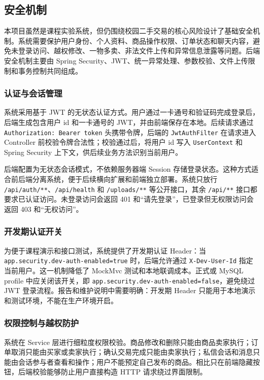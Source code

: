 ﻿\documentclass[UTF8,a4paper,12pt]{ctexart}
\begin{document}
\subsection{安全机制}
本项目虽然是课程实验系统，但仍围绕校园二手交易的核心风险设计了基础安全机制。系统需要保护用户身份、个人资料、商品操作权限、订单状态和聊天内容，避免未登录访问、越权修改、一物多卖、非法文件上传和异常信息泄露等问题。后端安全机制主要由 Spring Security、JWT、统一异常处理、参数校验、文件上传限制和事务控制共同组成。

\subsubsection{认证与会话管理}
系统采用基于 JWT 的无状态认证方式。用户通过一卡通号和验证码完成登录后，后端生成包含用户 id 和一卡通号的 JWT，并由前端保存在本地。后续请求通过 \texttt{Authorization: Bearer token} 头携带令牌，后端的 \texttt{JwtAuthFilter} 在请求进入 Controller 前校验令牌合法性；校验通过后，将用户 id 写入 \texttt{UserContext} 和 Spring Security 上下文，供后续业务方法识别当前用户。

后端配置为无状态会话模式，不依赖服务器端 Session 存储登录状态。这种方式适合前后端分离系统，便于后续横向扩展和前端独立部署。系统只放行 \texttt{/api/auth/**}、\texttt{/api/health} 和 \texttt{/uploads/**} 等公开接口，其余 \texttt{/api/**} 接口都要求已认证访问。未登录访问会返回 401 和“请先登录”，已登录但无权限访问会返回 403 和“无权访问”。

\subsubsection{开发期认证开关}
为便于课程演示和接口测试，系统提供了开发期认证 Header：当 \texttt{app.security.dev-auth-enabled=true} 时，后端允许通过 \texttt{X-Dev-User-Id} 指定当前用户。这一机制降低了 MockMvc 测试和本地联调成本。正式或 MySQL profile 中应关闭该开关，即 \texttt{app.security.dev-auth-enabled=false}，避免绕过 JWT 登录流程。报告和维护说明中需要明确：开发期 Header 只能用于本地演示和测试环境，不能在生产环境开启。

\subsubsection{权限控制与越权防护}
系统在 Service 层进行细粒度权限校验。商品修改和删除只能由商品卖家执行；订单取消只能由买家或卖家执行；确认交易完成只能由卖家执行；私信会话和消息只能由会话参与者查看和操作；用户不能预定自己发布的商品。相比只在前端隐藏按钮，后端校验能够防止用户直接构造 HTTP 请求绕过界面限制。
\end{document}

